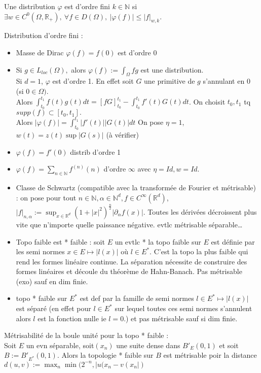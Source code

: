 Une distribution $\varphi $ est d'ordre fini $k\in \mathbb{N} $ si $\exists w\in C^0(\Omega,\mathbb{R} _+),\ \forall f\in D(\Omega),\ |\varphi (f)|\le |f|_{w,k} $.
\begin{ex}
    Distribution d'ordre fini :
    \begin{itemize}
        \item Masse de Dirac $\varphi (f)=f(0)$ est d'ordre 0
        \item Si $g\in L_{loc}(\Omega),$ alors $\varphi (f):=\int_\Omega fg$ est une distribution. \\
            Si $d=1$, $\varphi $ est d'ordre 1. En effet soit $G$ une primitive de $g$ s'annulant en 0 (si 0$\in \Omega)$. \\Alors $\int_{t_0}^{t_1}f(t)g(t)dt=[fG]_{t_0}^{t_1}-\int_{t_0}^{t_1}f'(t)G(t)dt$. On choisit $t_0,t_1$ tq $supp(f)\subset [t_0,t_1].$ \\Alors $|\varphi (f)|=\int_{t_0}^{t_1}|f'(t)| |G(t)|dt$ On pose $\eta=1 $, $w(t)=z(t)\sup|G(s)|$ (à vérifier)
        \item $\varphi (f)=f'(0)$ distrib d'ordre 1
        \item $\varphi (f)=\sum\limits_{n\in \mathbb{N} }^{} f^{(n)}(n)$ d'ordre $\infty $ avec $\eta=Id, w=Id$.
        \item  Classe de Schwartz (compatible avec la transformée de Fourier et métrisable) : on pose pour tout $n\in \mathbb{N} , \alpha \in \mathbb{N} ^d,f\in C^\infty (\mathbb{R} ^d)$, $|f|_{n, \alpha }:=\sup_{x\in \mathbb{R} ^d}(1+|x|^2)^{\frac{n}{2}}|\partial_\alpha f(x)|$. Toutes les dérivées décroissent plus vite que n'importe quelle paissance négative. evtlc métrisable séparable\ldots
        \item Topo faible est * faible : soit $E$ un evtlc * la topo faible sur $E$ est définie par les semi normes $x\in E\mapsto |l(x)|$ où $l\in E^*$. C'est la topo la plus faible qui rend les formes linéaire continue. La séparation nécessite de construire des formes linéaires et découle du théorème de Hahn-Banach. Pas métrisable (exo) sauf en dim finie.
        \item topo * faible sur $E^*$ est def par la famille de semi normes $l\in E^*\mapsto |l(x)|$ est séparé (en effet pour $l\in E^*$ sur lequel toutes ces semi normes s'annulent alors $l$ est la fonction nulle ie $l=0$.) et pas métrisable sauf si dim finie.
    \end{itemize}
\end{ex}
\begin{proposition}
    Métrisabilité de la boule unité pour la topo * faible :\\
    Soit $E$ un evn séparable, soit$(x_{n})$ une suite dense dans $B'_E(0,1)$ et soit $B:=B'_{E^*}(0,1)$. Alors la topologie * faible sur $B$ est métrisable poir la distance $d(u,v):=\max_n\min(2^{-n}, |u(x_{n}-v(x_{n}|)$
\end{proposition}

